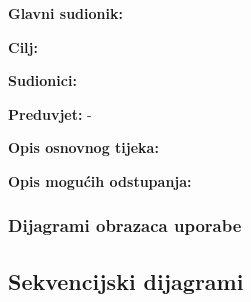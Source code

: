                     \noindent {}
					\begin{packed_item}
	
						\item \textbf{Glavni sudionik: }
						\item  \textbf{Cilj:} 
						\item  \textbf{Sudionici:} 
						\item  \textbf{Preduvjet:} -
						\item  \textbf{Opis osnovnog tijeka:}
						
						\item[] \begin{packed_enum}
	
							\item 
							\item 
							\item 

						\end{packed_enum}
						
						\item  \textbf{Opis mogućih odstupanja:}
						
						\item[] \begin{packed_item}
	
							\item[2.a] 
							\item[] \begin{packed_enum}
								
								\item 
								\item 
							\end{packed_enum}
							
						\end{packed_item}
					\end{packed_item}

     
     
				\subsubsection{Dijagrami obrazaca uporabe}
					
				\eject		
				
			\subsection{Sekvencijski dijagrami}
				

